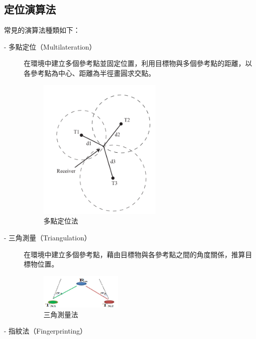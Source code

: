     \subsection{定位演算法}
    \label{chp:method-algorithm}
    常見的演算法種類如下：
    \begin{description}
        \item[- 多點定位（Multilateration）]\hfill 
        
        \qquad
        在環境中建立多個參考點並固定位置，利用目標物與多個參考點的距離，以各參考點為中心、距離為半徑畫圓求交點。
        \begin{figure}[h]
            \centering
            \includegraphics[width=6cm]{ch2pic/multilateration.png}
            \caption{多點定位法\cite{survey_light2020}}
            \label{pic:multilateration}
        \end{figure}
    
        \item[- 三角測量（Triangulation）] \hfill 
        
        \qquad
        在環境中建立多個參考點，藉由目標物與各參考點之間的角度關係，推算目標物位置。
        \begin{figure}[h]
            \centering
            \includegraphics[width=4cm]{ch2pic/triangulation.png}
            \caption{三角測量法\cite{pic:triangulation}}
            \label{pic:triangulation}
        \end{figure}
        
        \item[- 指紋法（Fingerprinting）] \hfill 
        

\end{description}
